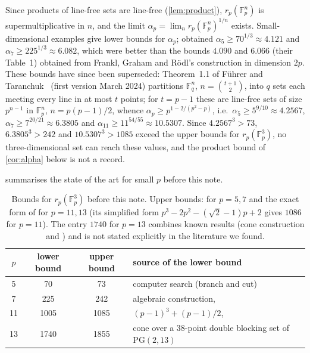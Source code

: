 \documentclass[11pt]{article}
\numberwithin{equation}{section}
\theoremstyle{definition}
\theoremstyle{remark}
\newcommand{\F}{\mathbb F}
\begin{document}
Since products of line-free sets are line-free (\cref{lem:product}), $r_p(\F_p^n)$ is
supermultiplicative in $n$, and the limit $\alpha_p=\lim_n r_p(\F_p^n)^{1/n}$ exists.
Small-dimensional examples give lower bounds for $\alpha_p$; \cite{EFFKPSV} obtained
$\alpha_5\ge 70^{1/3}\approx4.121$ and $\alpha_7\ge225^{1/3}\approx6.082$, which were better than
the bounds $4.090$ and $6.066$ (their Table~1) obtained from Frankl, Graham and R\"odl's
construction in dimension $2p$. These bounds have since been superseded: Theorem~1.1 of
F\"uhrer and Taranchuk~\cite{FuhrerTaranchuk} (first version March 2024) partitions
$\F_q^{n}$, $n=\binom{t+1}2$, into $q$ sets each meeting every line in at most $t$ points; for
$t=p-1$ these are line-free sets of size $p^{n-1}$ in $\F_p^{n}$, $n=p(p-1)/2$, whence
$\alpha_p\ge p^{1-2/(p^2-p)}$, i.e.\ $\alpha_5\ge5^{9/10}\approx4.2567$,
$\alpha_7\ge7^{20/21}\approx6.3805$ and $\alpha_{11}\ge11^{54/55}\approx10.5307$. Since
$4.2567^3>73$, $6.3805^3>242$ and $10.5307^3>1085$ exceed the upper bounds for
$r_p(\F_p^3)$, no three-dimensional set can reach these values, and the product bound
of \cref{cor:alpha} below is not a record.

 summarises the state of the art for small $p$ before this note.

\begin{table}[h]
\centering
\begin{tabular}{@{}cccl@{}}
\toprule
$p$ & lower bound & upper bound & source of the lower bound\\
\midrule
5 & 70 & 73 & computer search (branch and cut) \cite{EFFKPSV}\\
7 & 225 & 242 & algebraic construction, \cite[Thm.~1.2]{EFFKPSV}\\
11 & 1005 & 1085 & $(p-1)^3+(p-1)/2$, \cite[Thm.~1.1 and 1.7]{EFFKPSV}\\
13 & 1740 & 1855 & cone over a $38$-point double blocking set of $\mathrm{PG}(2,13)$ \cite{BKW,CsH}\\
\bottomrule
\end{tabular}
\caption{Bounds for $r_p(\F_p^3)$ before this note. Upper bounds: \cite[Thm.~1.5, 1.6]{EFFKPSV}
for $p=5,7$ and the exact form of \cite[Cor.~1.4]{EFFKPSV} for $p=11,13$ (its simplified form
$p^3-2p^2-(\sqrt2-1)p+2$ gives $1086$ for $p=11$). The entry $1740$ for $p=13$ combines known
results (cone construction and \cite{BKW,CsH}) and is not stated explicitly in the literature we
found.}
\label{tab:bounds}
\end{table}
\end{document}
